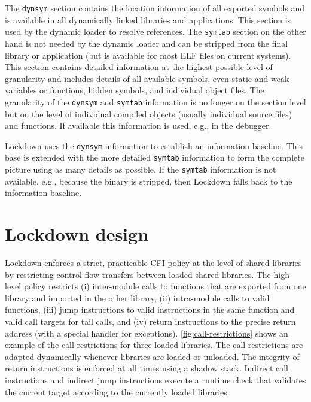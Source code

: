 \documentclass{acm_proc_article-sp}
\begin{document}
The \texttt{dynsym} section contains the location information of all exported
symbols and is available in all dynamically linked libraries and
applications. This section is used by the dynamic loader to resolve references.
The \texttt{symtab} section on the other hand is not needed by the dynamic
loader and can be stripped from the final library or application (but is
available for most ELF files on current systems). This section contains detailed
information at the highest possible level of granularity and includes details of
all available symbols, even static and weak variables or functions, hidden
symbols, and individual object files. The granularity of the \texttt{dynsym} and
\texttt{symtab} information is no longer on the section level but on the level
of individual compiled objects (usually individual source files) and functions.
If available this information is used, e.g., in the debugger.

Lockdown uses the \texttt{dynsym} information to establish an information
baseline. This base is extended with the more detailed \texttt{symtab}
information to form the complete picture using as many details as possible. If
the \texttt{symtab} information is not available, e.g., because the binary is
stripped, then Lockdown falls back to the information baseline.


\section{Lockdown design}\label{sec:design}



Lockdown enforces a strict, practicable CFI policy at the level of shared
libraries by restricting control-flow transfers between loaded shared libraries.
The high-level policy restricts (i) inter-module calls to functions that are
exported from one library and imported in the other library, (ii) intra-module
calls to valid functions, (iii) jump instructions to valid instructions in the
same function and valid call targets for tail calls, and (iv) return
instructions to the precise return address (with a special handler for
exceptions). \autoref{fig:call-restrictions} shows an example of the call
restrictions for three loaded libraries. The call restrictions are adapted
dynamically whenever libraries are loaded or unloaded.
The integrity of return instructions is enforced at all times using a shadow
stack. Indirect call instructions and indirect jump instructions execute a
runtime check that validates the current target according to the currently
loaded libraries.
\end{document}

